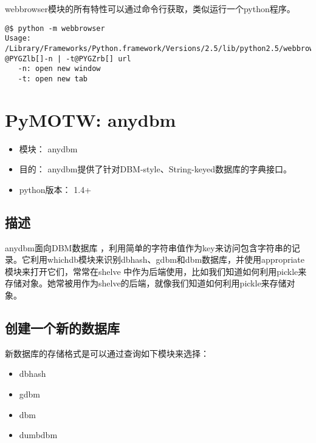 \documentclass[a4paper,10pt,english]{manual}
\begin{document}
webbrowser模块的所有特性可以通过命令行获取，类似运行一个python程序。

\begin{Verbatim}[commandchars=@\[\]]
@$ python -m webbrowser
Usage: /Library/Frameworks/Python.framework/Versions/2.5/lib/python2.5/webbrowser.py @PYGZlb[]-n | -t@PYGZrb[] url
   -n: open new window
   -t: open new tab
\end{Verbatim}

\resetcurrentobjects


\section{PyMOTW: anydbm}
\begin{itemize}
\item {} 
模块： anydbm

\item {} 
目的： anydbm提供了针对DBM-style、String-keyed数据库的字典接口。

\item {} 
python版本： 1.4+

\end{itemize}


\subsection{描述}

anydbm面向DBM数据库 ，利用简单的字符串值作为key来访问包含字符串的记录。它利用whichdb模块来识别dbhash、gdbm和dbm数据库，并使用appropriate模块来打开它们，常常在shelve 中作为后端使用，比如我们知道如何利用pickle来存储对象。她常被用作为shelve的后端，就像我们知道如何利用pickle来存储对象。


\subsection{创建一个新的数据库}

新数据库的存储格式是可以通过查询如下模块来选择：
\begin{itemize}
\item {} 
dbhash

\item {} 
gdbm

\item {} 
dbm

\item {} 
dumbdbm

\end{itemize}
\end{document}
